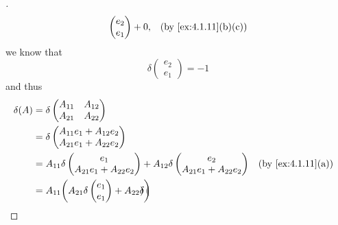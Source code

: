 \begin{proof}[]
\begin{align*}
\begin{pmatrix}
                          e_2 \\
                          e_1
                        \end{pmatrix} + 0,       &  & \by{ex:4.1.11}[b,c]
  \end{align*}
  we know that
  \[
    \delta\begin{pmatrix}
      e_2 \\
      e_1
    \end{pmatrix} = -1
  \]
  and thus
  \begin{align*}
    \delta(A) & = \delta\begin{pmatrix}
                          A_{1 1} & A_{1 2} \\
                          A_{2 1} & A_{2 2}
                        \end{pmatrix}                                                                                     \\
              & = \delta\begin{pmatrix}
                          A_{1 1} e_1 + A_{1 2} e_2 \\
                          A_{2 1} e_1 + A_{2 2} e_2
                        \end{pmatrix}                                                                             \\
              & = A_{1 1} \delta\begin{pmatrix}
                                  e_1 \\
                                  A_{2 1} e_1 + A_{2 2} e_2
                                \end{pmatrix} + A_{1 2} \delta\begin{pmatrix}
                                                                e_2 \\
                                                                A_{2 1} e_1 + A_{2 2} e_2
                                                              \end{pmatrix}             &  & \by{ex:4.1.11}[a]                \\
              & = A_{1 1} \pa{A_{2 1} \delta\begin{pmatrix}
                                                e_1 \\
                                                e_1
                                              \end{pmatrix} + A_{2 2} \delta\begin{pmatrix}

\end{pmatrix}}
\end{align*}
\end{proof}
